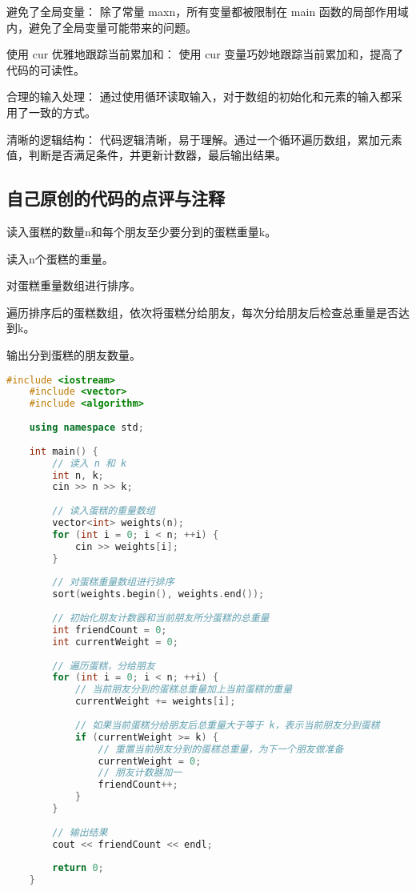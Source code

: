 避免了全局变量： 除了常量 maxn，所有变量都被限制在 main 函数的局部作用域内，避免了全局变量可能带来的问题。

使用 cur 优雅地跟踪当前累加和： 使用 cur 变量巧妙地跟踪当前累加和，提高了代码的可读性。

合理的输入处理： 通过使用循环读取输入，对于数组的初始化和元素的输入都采用了一致的方式。

清晰的逻辑结构： 代码逻辑清晰，易于理解。通过一个循环遍历数组，累加元素值，判断是否满足条件，并更新计数器，最后输出结果。

\subsection{自己原创的代码的点评与注释}

读入蛋糕的数量n和每个朋友至少要分到的蛋糕重量k。

读入n个蛋糕的重量。

对蛋糕重量数组进行排序。

遍历排序后的蛋糕数组，依次将蛋糕分给朋友，每次分给朋友后检查总重量是否达到k。

输出分到蛋糕的朋友数量。

\begin{lstlisting}[language=C++]
    #include <iostream>
    #include <vector>
    #include <algorithm>
    
    using namespace std;
    
    int main() {
        // 读入 n 和 k
        int n, k;
        cin >> n >> k;
    
        // 读入蛋糕的重量数组
        vector<int> weights(n);
        for (int i = 0; i < n; ++i) {
            cin >> weights[i];
        }
    
        // 对蛋糕重量数组进行排序
        sort(weights.begin(), weights.end());
    
        // 初始化朋友计数器和当前朋友所分蛋糕的总重量
        int friendCount = 0;
        int currentWeight = 0;
    
        // 遍历蛋糕，分给朋友
        for (int i = 0; i < n; ++i) {
            // 当前朋友分到的蛋糕总重量加上当前蛋糕的重量
            currentWeight += weights[i];
            
            // 如果当前蛋糕分给朋友后总重量大于等于 k，表示当前朋友分到蛋糕
            if (currentWeight >= k) {
                // 重置当前朋友分到的蛋糕总重量，为下一个朋友做准备
                currentWeight = 0;
                // 朋友计数器加一
                friendCount++;
            }
        }
    
        // 输出结果
        cout << friendCount << endl;
    
        return 0;
    }    
\end{lstlisting}